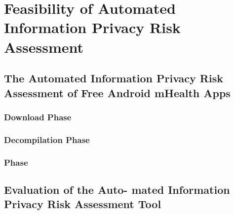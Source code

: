 \section{Feasibility of Automated Information Privacy Risk Assessment}

\subsection{The Automated Information Privacy Risk Assessment of Free Android mHealth Apps}

\subsubsection{Download Phase}

\subsubsection{Decompilation Phase}

\subsubsection{\Sca Phase}

\subsection{Evaluation of the Auto- mated Information Privacy Risk Assessment Tool}